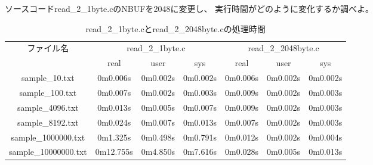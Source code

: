 \documentclass[12pt]{jarticle}
\begin{document}
\begin{itembox}[l]{}
    ソースコードread\_2\_1byte.cのNBUFを2048に変更し、
    実行時間がどのように変化するか調べよ。
\end{itembox}
\begin{table}[h]
    \caption{read\_2\_1byte.cとread\_2\_2048byte.cの処理時間}
    \begin{center}
        \begin{tabular}{|c||c|c|c|c|c|c|}
            \hline
            \multirow{2}{*}{ファイル名} & \multicolumn{3}{|c|}{read\_2\_1byte.c} & \multicolumn{3}{|c|}{read\_2\_2048byte.c}                                             \\
            \cline{2-7}
                                        & real                                   & user                                      & sys      & real     & user     & sys      \\
            \hhline{|=#===|===|}
            sample\_10.txt              & 0m0.006s                               & 0m0.002s                                  & 0m0.002s & 0m0.006s & 0m0.002s & 0m0.002s \\
            \hline
            sample\_100.txt             & 0m0.007s                               & 0m0.002s                                  & 0m0.003s & 0m0.009s & 0m0.002s & 0m0.003s \\
            \hline
            sample\_4096.txt            & 0m0.013s                               & 0m0.005s                                  & 0m0.007s & 0m0.009s & 0m0.002s & 0m0.003s \\
            \hline
            sample\_8192.txt            & 0m0.024s                               & 0m0.007s                                  & 0m0.013s & 0m0.007s & 0m0.002s & 0m0.003s \\
            \hline
            sample\_1000000.txt         & 0m1.325s                               & 0m0.498s                                  & 0m0.791s & 0m0.012s & 0m0.002s & 0m0.004s \\
            \hline
            sample\_10000000.txt        & 0m12.755s                              & 0m4.850s                                  & 0m7.616s & 0m0.028s & 0m0.005s & 0m0.013s \\
            \hline
        \end{tabular}
    \end{center}
    \label{tbl2}
\end{table}
\end{document}
